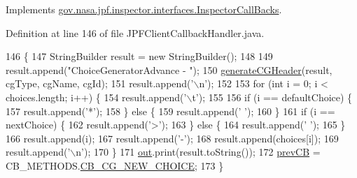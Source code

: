 Implements \hyperlink{interfacegov_1_1nasa_1_1jpf_1_1inspector_1_1interfaces_1_1_inspector_call_backs_a8ebe532769c4bced7461e073fa79a7a0}{gov.\+nasa.\+jpf.\+inspector.\+interfaces.\+Inspector\+Call\+Backs}.



Definition at line 146 of file J\+P\+F\+Client\+Callback\+Handler.\+java.


\begin{DoxyCode}
146                                                                                                            
                                       \{
147     StringBuilder result = \textcolor{keyword}{new} StringBuilder();
148 
149     result.append(\textcolor{stringliteral}{"ChoiceGeneratorAdvance - "});
150     \hyperlink{classgov_1_1nasa_1_1jpf_1_1inspector_1_1client_1_1_j_p_f_client_callback_handler_a22353a4cf73f73eaa9c953e58700c1f3}{generateCGHeader}(result, cgType, cgName, cgId);
151     result.append(\textcolor{charliteral}{'\(\backslash\)n'});
152 
153     \textcolor{keywordflow}{for} (\textcolor{keywordtype}{int} i = 0; i < choices.length; i++) \{
154       result.append(\textcolor{charliteral}{'\(\backslash\)t'});
155 
156       \textcolor{keywordflow}{if} (i == defaultChoice) \{
157         result.append(\textcolor{charliteral}{'*'});
158       \} \textcolor{keywordflow}{else} \{
159         result.append(\textcolor{charliteral}{' '});
160       \}
161       \textcolor{keywordflow}{if} (i == nextChoice) \{
162         result.append(\textcolor{charliteral}{'>'});
163       \} \textcolor{keywordflow}{else} \{
164         result.append(\textcolor{charliteral}{' '});
165       \}
166       result.append(i);
167       result.append(\textcolor{charliteral}{'-'});
168       result.append(choices[i]);
169       result.append(\textcolor{charliteral}{'\(\backslash\)n'});
170     \}
171     \hyperlink{classgov_1_1nasa_1_1jpf_1_1inspector_1_1client_1_1_j_p_f_client_callback_handler_ad51e474b5613fa4a46c8965c069fb9f7}{out}.print(result.toString());
172     \hyperlink{classgov_1_1nasa_1_1jpf_1_1inspector_1_1client_1_1_j_p_f_client_callback_handler_a1e5272638212d9246e98ced9a5a78012}{prevCB} = CB\_METHODS.\hyperlink{enumgov_1_1nasa_1_1jpf_1_1inspector_1_1interfaces_1_1_inspector_call_backs_1_1_c_b___m_e_t_h_o_d_s_a8a96693b7f439f0cefd0c31099c502cc}{CB\_CG\_NEW\_CHOICE};
173   \}
\end{DoxyCode}
